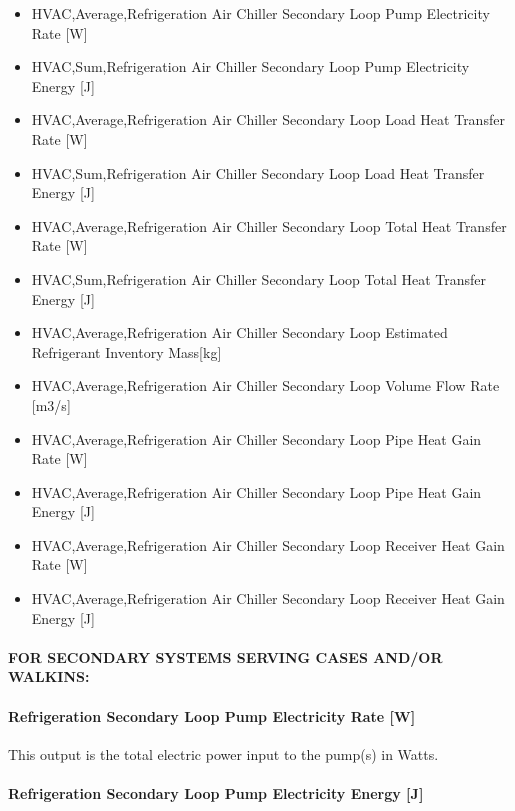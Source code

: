 \begin{itemize}
\item
  HVAC,Average,Refrigeration Air Chiller Secondary Loop Pump Electricity Rate {[}W{]}
\item
  HVAC,Sum,Refrigeration Air Chiller Secondary Loop Pump Electricity Energy {[}J{]}
\item
  HVAC,Average,Refrigeration Air Chiller Secondary Loop Load Heat Transfer Rate {[}W{]}
\item
  HVAC,Sum,Refrigeration Air Chiller Secondary Loop Load Heat Transfer Energy {[}J{]}
\item
  HVAC,Average,Refrigeration Air Chiller Secondary Loop Total Heat Transfer Rate {[}W{]}
\item
  HVAC,Sum,Refrigeration Air Chiller Secondary Loop Total Heat Transfer Energy {[}J{]}
\item
  HVAC,Average,Refrigeration Air Chiller Secondary Loop Estimated Refrigerant Inventory Mass{[}kg{]}
\item
  HVAC,Average,Refrigeration Air Chiller Secondary Loop Volume Flow Rate {[}m3/s{]}
\item
  HVAC,Average,Refrigeration Air Chiller Secondary Loop Pipe Heat Gain Rate {[}W{]}
\item
  HVAC,Average,Refrigeration Air Chiller Secondary Loop Pipe Heat Gain Energy {[}J{]}
\item
  HVAC,Average,Refrigeration Air Chiller Secondary Loop Receiver Heat Gain Rate {[}W{]}
\item
  HVAC,Average,Refrigeration Air Chiller Secondary Loop Receiver Heat Gain Energy {[}J{]}
\end{itemize}

\paragraph{FOR SECONDARY SYSTEMS SERVING CASES AND/OR WALKINS:}\label{for-secondary-systems-serving-cases-andor-walkins}

\paragraph{Refrigeration Secondary Loop Pump Electricity Rate {[}W{]}}\label{refrigeration-secondary-loop-pump-electric-power-w}

This output is the total electric power input to the pump(s) in Watts.

\paragraph{Refrigeration Secondary Loop Pump Electricity Energy {[}J{]}}\label{refrigeration-secondary-loop-pump-electric-energy-j}

